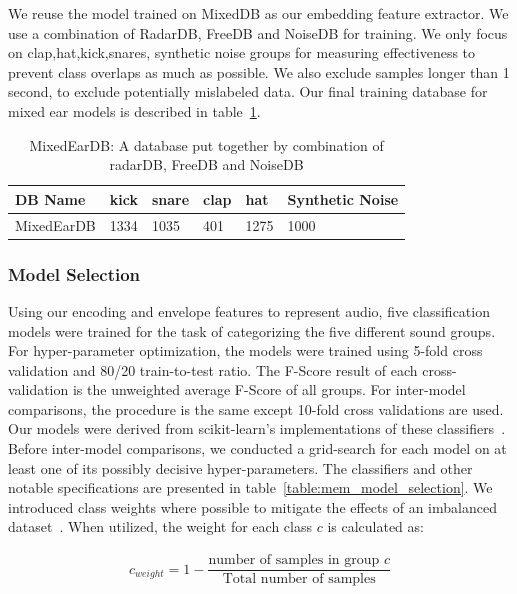 \documentclass[\main/thesis.tex]{subfiles}
\begin{document}
We reuse the model trained on  MixedDB as our embedding feature extractor. We use a combination of RadarDB, FreeDB and NoiseDB for training. We only focus on clap,hat,kick,snares, synthetic noise groups for measuring effectiveness to prevent class overlaps as much as possible. We also exclude samples longer than 1 second, to exclude potentially mislabeled data. Our final training database for mixed ear models is described in table~\ref{db:memDB}.
\begin{table}[htbp]
\centering
\begin{tabular}{|l|l|l|l|l|l|}
\hline
 DB Name & kick & snare & clap & hat & Synthetic Noise\\\hline
 MixedEarDB & 1334 & 1035 & 401 & 1275 & 1000 \\ \hline
\end{tabular}
\caption{MixedEarDB: A database put together by combination of radarDB, FreeDB and NoiseDB}
\label{db:memDB}
\end{table}

\subsubsection{Model Selection}
Using our encoding and envelope features to represent audio, five classification models were trained for the task of categorizing the five different sound groups. For hyper-parameter optimization, the models were trained using 5-fold cross validation and 80/20 train-to-test ratio. The F-Score result of each cross-validation is the unweighted average F-Score of all groups. For inter-model comparisons, the procedure is the same except 10-fold cross validations are used. Our models were derived from scikit-learn's implementations of these classifiers~\cite{pedregosa2011scikit}. Before inter-model comparisons, we conducted a grid-search for each model on at least one of its possibly decisive hyper-parameters. The classifiers and other notable specifications are presented in table~\ref{table:mem_model_selection}. We introduced class weights where possible to mitigate the effects of an imbalanced dataset~\cite{provost2000machine,chawla2004special}. When utilized, the weight for each class $c$  is calculated as:

\begin{subequations}
    \begin{align*}
    c_{weight} = 1-\dfrac{\text{number of samples in group $c$} }{\text{Total number of samples}}
    \end{align*}
\end{subequations}
\end{document}
